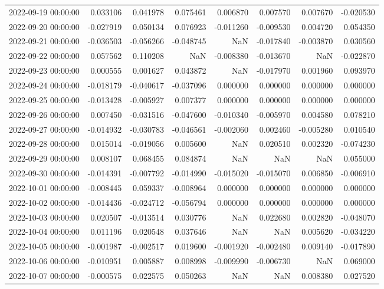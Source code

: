 \begin{tabular}{lrrrrrrr}
2022-09-19 00:00:00 & 0.033106 & 0.041978 & 0.075461 & 0.006870 & 0.007570 & 0.007670 & -0.020530 \\
2022-09-20 00:00:00 & -0.027919 & 0.050134 & 0.076923 & -0.011260 & -0.009530 & 0.004720 & 0.054350 \\
2022-09-21 00:00:00 & -0.036503 & -0.056266 & -0.048745 & NaN & -0.017840 & -0.003870 & 0.030560 \\
2022-09-22 00:00:00 & 0.057562 & 0.110208 & NaN & -0.008380 & -0.013670 & NaN & -0.022870 \\
2022-09-23 00:00:00 & 0.000555 & 0.001627 & 0.043872 & NaN & -0.017970 & 0.001960 & 0.093970 \\
2022-09-24 00:00:00 & -0.018179 & -0.040617 & -0.037096 & 0.000000 & 0.000000 & 0.000000 & 0.000000 \\
2022-09-25 00:00:00 & -0.013428 & -0.005927 & 0.007377 & 0.000000 & 0.000000 & 0.000000 & 0.000000 \\
2022-09-26 00:00:00 & 0.007450 & -0.031516 & -0.047600 & -0.010340 & -0.005970 & 0.004580 & 0.078210 \\
2022-09-27 00:00:00 & -0.014932 & -0.030783 & -0.046561 & -0.002060 & 0.002460 & -0.005280 & 0.010540 \\
2022-09-28 00:00:00 & 0.015014 & -0.019056 & 0.005600 & NaN & 0.020510 & 0.002320 & -0.074230 \\
2022-09-29 00:00:00 & 0.008107 & 0.068455 & 0.084874 & NaN & NaN & NaN & 0.055000 \\
2022-09-30 00:00:00 & -0.014391 & -0.007792 & -0.014990 & -0.015020 & -0.015070 & 0.006850 & -0.006910 \\
2022-10-01 00:00:00 & -0.008445 & 0.059337 & -0.008964 & 0.000000 & 0.000000 & 0.000000 & 0.000000 \\
2022-10-02 00:00:00 & -0.014436 & -0.024712 & -0.056794 & 0.000000 & 0.000000 & 0.000000 & 0.000000 \\
2022-10-03 00:00:00 & 0.020507 & -0.013514 & 0.030776 & NaN & 0.022680 & 0.002820 & -0.048070 \\
2022-10-04 00:00:00 & 0.011196 & 0.020548 & 0.037646 & NaN & NaN & 0.005620 & -0.034220 \\
2022-10-05 00:00:00 & -0.001987 & -0.002517 & 0.019600 & -0.001920 & -0.002480 & 0.009140 & -0.017890 \\
2022-10-06 00:00:00 & -0.010951 & 0.005887 & 0.008998 & -0.009990 & -0.006730 & NaN & 0.069000 \\
2022-10-07 00:00:00 & -0.000575 & 0.022575 & 0.050263 & NaN & NaN & 0.008380 & 0.027520 \\

\end{tabular}
